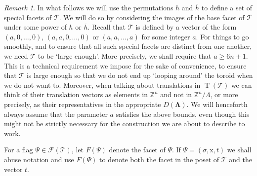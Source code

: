 \documentclass[final]{amsart}
\theoremstyle{plain}
\theoremstyle{definition}
\theoremstyle{remark}
\newtheorem{rem}[thm]{Remark}
\numberwithin{equation}{section}
\renewcommand{\{}{\lbrace}
\renewcommand{\}}{\rbrace}
\renewcommand{\bar}{\overline}
\newcommand{\bZ}{\mathbb{Z}}
\newcommand{\cF}{\mathcal{F}}
\newcommand{\cT}{\mathcal{T}}
\newcommand{\LL}{\Lambda}
\newcommand{\bLL}{\mathbf{\Lambda}}
\newcommand{\cyvec}[1]{{\mathrm{#1}}}
\newcommand{\vx}{\cyvec{x}}
\DeclareMathOperator{\tras}{T}
\newcommand{\kng}{{h}}
\begin{document}
\begin{rem}\label{rem:largeToroid} 
In what follows we will use the permutations $\kng$ and $\bar{\kng}$ to define a set of special facets of $\cT$. 
We will do so by considering the images of the base facet of $\cT$ under some power of $\kng$ or $\bar{\kng}$. 
Recall that $\cT$ is defined by a vector of the form $(a,0,\ldots,0)$, $(a,a,0,\ldots,0)$ or $(a,a,\ldots,a)$ for some integer $a$. 
For things to go smoothly, and to ensure that all such special facets are distinct from one another, we need $\cT$ to be `large enough'.
More precisely, we shall require that $a \geq 6n + 1$.
This is a technical requirement we impose for the sake of convenience, to ensure that $\cT$ is large enough so that we do not end up `looping around' the toroid when we do not want to.
Moreover, when talking about translations in $\tras(\cT)$ we can think of their translation vectors as elements in $\bZ^n$ and not in $\bZ^n/\LL$, or more precisely, as their representatives in the appropriate $D(\bLL)$.
We will henceforth always assume that the parameter $a$ satisfies the above bounds, even though this might not be strictly necessary for the construction we are about to describe to work.
\end{rem}

 For a flag $\Psi \in \cF(\cT)$, let $F(\Psi)$ denote the facet of $\Psi$.
 If $\Psi = (\sigma, \vx, t)$ we shall abuse notation and use $F(\Psi)$ to denote both the facet in the poset of $\cT$ and the vector $t$.
\end{document}
